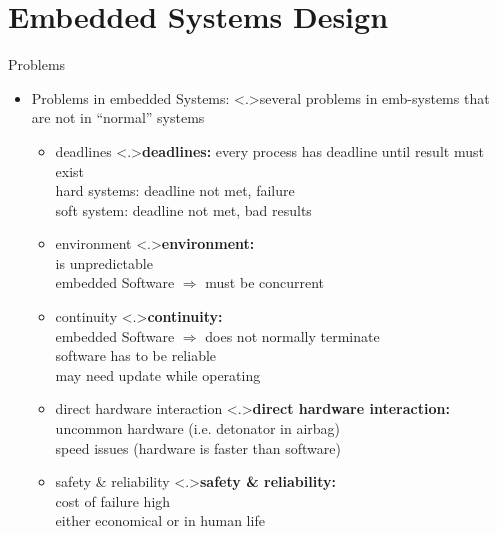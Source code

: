 \documentclass[ngerman={babel}, utf8, bigger, t, xcolor={table,dvipsnames}, ompress, hyperref={bookmarks,colorlinks},red]{beamer}
\begin{document}
\section{Embedded Systems Design}
\begin{frame}{Problems}
	\begin{itemize}
		\item Problems in embedded Systems:
		\note<.>{several problems in emb-systems that are not in ``normal'' systems}
		\begin{itemize}
			\item deadlines
			\note<.>{\textbf{deadlines:} every process has deadline until result must exist \\ hard systems: deadline not met, failure\\ soft system: deadline not met, bad results}
			\item environment
			\note<.>{\textbf{environment:}\\ is unpredictable \\ embedded Software $\Rightarrow$ must be concurrent}
			\item continuity
			\note<.>{\textbf{continuity:}\\ embedded Software $\Rightarrow$ does not normally terminate \\ software has to be reliable \\ may need update while operating}
			\item direct hardware interaction
			\note<.>{\textbf{direct hardware interaction:}\\ uncommon hardware (i.e. detonator in airbag) \\ speed issues (hardware is faster than software)}
			\item safety \& reliability
			\note<.>{\textbf{safety \& reliability:}\\ cost of failure high \\ either economical or in human life}
		\end{itemize}
	\end{itemize}
\end{frame}
\end{document}
